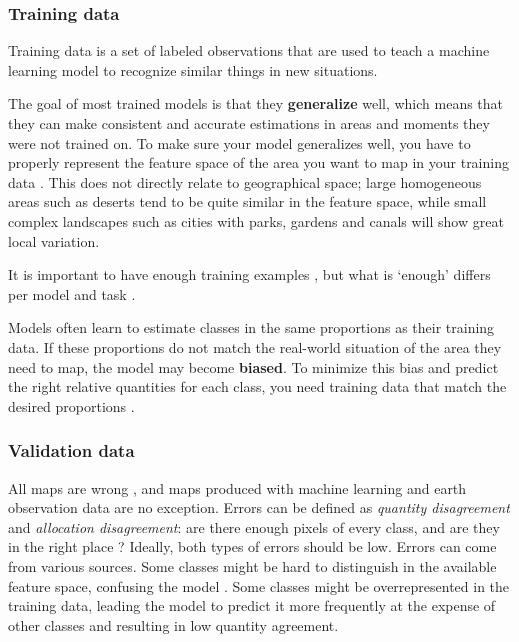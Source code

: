    \subsubsection{Training data}

        Training data is a set of labeled observations that are used to teach a machine learning model to recognize similar things in new situations. 
        
        The goal of most trained models is that they \textbf{generalize} well, which means that they can make consistent and accurate estimations in areas and moments they were not trained on. To make sure your model generalizes well, you have to properly represent the feature space of the area you want to map in your training data \citep{meyer2021predicting}. This does not directly relate to geographical space; large homogeneous areas such as deserts tend to be quite similar in the feature space, while small complex landscapes such as cities with parks, gardens and canals will show great local variation. 

        It is important to have enough training examples \citep{ramezan2021effects,rodriguez-perez2017influence,zhu2016optimizing}, but what is `enough' differs per model \citep{myburgh2014impact} and task \citep{koshute2021recommending}.
        
        Models often learn to estimate classes in the same proportions as their training data. If these proportions do not match the real-world situation of the area they need to map, the model may become \textbf{biased}. To minimize this bias and predict the right relative quantities for each class, you need training data that match the desired proportions \citep{he2009learning}.
        
    \subsubsection{Validation data}

        All maps are wrong \citep{monmonier2018how}, and maps produced with machine learning and earth observation data are no exception. Errors can be defined as \textit{quantity disagreement} and \textit{allocation disagreement}: are there enough pixels of every class, and are they in the right place \citep{pontius2006can,pontius2011death}? Ideally, both types of errors should be low. Errors can come from various sources. Some classes might be hard to distinguish in the available feature space, confusing the model \citep{shivakumar2017spectral}. Some classes might be overrepresented in the training data, leading the model to predict it more frequently at the expense of other classes and resulting in low quantity agreement.

